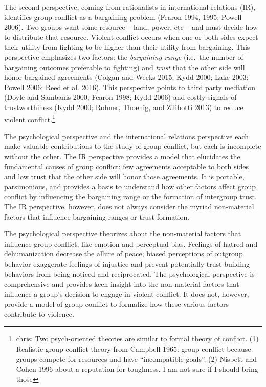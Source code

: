 \documentclass[11pt]{article}
\begin{document}
The second perspective, coming from rationalists in international
relations (IR), identifies group conflict as a bargaining problem
(Fearon 1994, 1995; Powell 2006). Two groups want some resource -- land,
power, etc -- and must decide how to distribute that resource. Violent
conflict occurs when one or both sides expect their utility from
fighting to be higher than their utility from bargaining. This
perspective emphasizes two factors: the \emph{bargaining range}
(i.e.~the number of bargaining outcomes preferable to fighting) and
\emph{trust} that the other side will honor bargained agreements (Colgan
and Weeks 2015; Kydd 2000; Lake 2003; Powell 2006; Reed et al. 2016).
This perspective points to third party mediation (Doyle and Sambanis
2000; Fearon 1998; Kydd 2006) and costly signals of trustworthiness
(Kydd 2000; Rohner, Thoenig, and Zilibotti 2013) to reduce violent
conflict.\footnote{chris: Two psych-oriented theories are similar to
  formal theory of conflict. (1) Realistic group conflict theory from
  Campbell 1965: group conflict because groups compete for resources and
  have ``incompatible goals''. (2) Nisbett and Cohen 1996 about a
  reputation for toughness. I am not sure if I should bring those }

The psychological perspective and the international relations
perspective each make valuable contributions to the study of group
conflict, but each is incomplete without the other. The IR perspective
provides a model that elucidates the fundamental causes of group
conflict: few agreements acceptable to both sides and low trust that the
other side will honor those agreements. It is portable, parsimonious,
and provides a basis to understand how other factors affect group
conflict by influencing the bargaining range or the formation of
intergroup trust. The IR perspective, however, does not always consider
the myriad non-material factors that influence bargaining ranges or
trust formation.

The psychological perspective theorizes about the non-material factors
that influence group conflict, like emotion and perceptual bias.
Feelings of hatred and dehumanization decrease the allure of peace;
biased perceptions of outgroup behavior exaggerate feelings of injustice
and prevent potentially trust-building behaviors from being noticed and
reciprocated. The psychological perspective is comprehensive and
provides keen insight into the non-material factors that influence a
group's decision to engage in violent conflict. It does not, however,
provide a model of group conflict to formalize how these various factors
contribute to violence.
\end{document}
